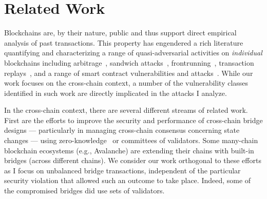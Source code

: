 \section{Related Work}


Blockchains are, by their nature, public and thus support direct
empirical analysis of past transactions.  This property has engendered a rich
literature quantifying and characterizing a range of quasi-adversarial
activities on \emph{individual} blockchains including
arbitrage~\cite{mclaughlin2023large, qin2022quantifying}, sandwich
attacks~\cite{qin2022quantifying, zhou2021high},
frontrunning~\cite{daian2020flash}, transaction
replays~\cite{qin2022quantifying}, and a range of smart contract
vulnerabilities and attacks~\cite{perez2021smart,grossman2017online,
  rodler2018sereum, zhang2020txspector, wu2021defiranger,
  ferreira2021eye}.  While our work focuses on the cross-chain
context, a number of the vulnerability classes
identified in such work are directly implicated in the attacks I analyze.%





In the cross-chain context, there are several different streams of
related work.  First are the efforts to improve the security and
performance of cross-chain bridge designs --- particularly in managing
cross-chain consensus concerning state changes --- using
zero-knowledge~\cite{xie2022zkbridge} or committees of
validators\cite{lan2021horizon,li2022polybridge}.
Some many-chain blockchain ecosystems (e.g., Avalanche) are extending
their chains with built-in bridges (across different chains). We consider our
work orthogonal to these efforts as I focus on unbalanced bridge transactions, independent of the particular
security violation that allowed such an outcome to take place.
Indeed, some of the compromised bridges did use sets of validators.

